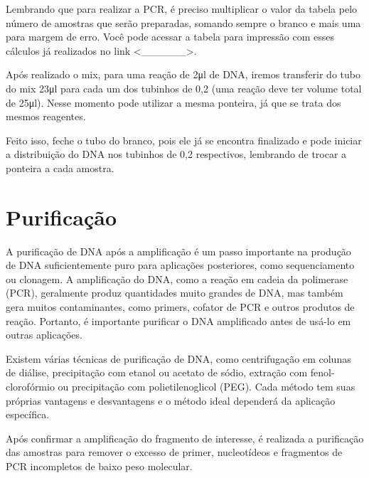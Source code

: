 \documentclass[
  letterpaper,
  DIV=11,
  numbers=noendperiod]{scrreprt}
\begin{document}
Lembrando que para realizar a PCR, é preciso multiplicar o valor da
tabela pelo número de amostras que serão preparadas, somando sempre o
branco e mais uma para margem de erro. Você pode acessar a tabela para
impressão com esses cálculos já realizados no link
\textless\_\_\_\_\_\_\textgreater.

Após realizado o mix, para uma reação de 2μl de DNA, iremos transferir
do tubo do mix 23μl para cada um dos tubinhos de 0,2 (uma reação deve
ter volume total de 25μl). Nesse momento pode utilizar a mesma ponteira,
já que se trata dos mesmos reagentes.

Feito isso, feche o tubo do branco, pois ele já se encontra finalizado e
pode iniciar a distribuição do DNA nos tubinhos de 0,2 respectivos,
lembrando de trocar a ponteira a cada amostra.

\hypertarget{purificauxe7uxe3o}{%
\chapter{Purificação}\label{purificauxe7uxe3o}}

A purificação de DNA após a amplificação é um passo importante na
produção de DNA suficientemente puro para aplicações posteriores, como
sequenciamento ou clonagem. A amplificação do DNA, como a reação em
cadeia da polimerase (PCR), geralmente produz quantidades muito grandes
de DNA, mas também gera muitos contaminantes, como primers, cofator de
PCR e outros produtos de reação. Portanto, é importante purificar o DNA
amplificado antes de usá-lo em outras aplicações.

Existem várias técnicas de purificação de DNA, como centrifugação em
colunas de diálise, precipitação com etanol ou acetato de sódio,
extração com fenol-clorofórmio ou precipitação com polietilenoglicol
(PEG). Cada método tem suas próprias vantagens e desvantagens e o método
ideal dependerá da aplicação específica.

Após confirmar a amplificação do fragmento de interesse, é realizada a
purificação das amostras para remover o excesso de primer, nucleotídeos
e fragmentos de PCR incompletos de baixo peso molecular.
\end{document}
